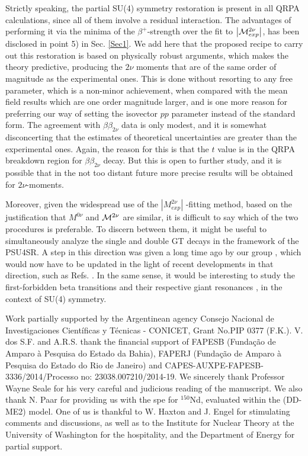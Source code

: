 \documentclass[nofootinbib,twocolumn,eqsecnum,floats,aps]{revtex4}
\def\b {{\beta}}
\begin{document}
{%
Strictly speaking, the partial SU(4) symmetry restoration is present in all QRPA
calculations, since all of them involve a residual interaction. The advantages
of performing it via the minima of the $\b^+$-strength over the fit
to $\left|{\cal M}^{2\nu}_{exp}\right|$, has been disclosed in  point 5)
in Sec. \ref{Sec1}.
We add here that the  proposed recipe to carry out this restoration is based
on physically robust arguments, which makes the theory  predictive, producing
the $2\nu$ moments that are of the same order of magnitude as the experimental ones.
This is done without resorting to any free parameter, which is a non-minor achievement,
when compared with the mean field results which are one order magnitude larger,  and
is one more reason for preferring our way of setting the isovector $pp$ parameter
instead of the standard form. The agreement with $\beta\beta_{2\nu}$ data is only modest,
and it is somewhat disconcerting that the estimates of theoretical uncertainties are greater
than the experimental ones. Again, the reason for this is that  the  $t$ value is
in the QRPA breakdown region for $\b\b_{2\nu}$ decay.
But this is open to further study, and it is possible that in the not too distant
future more precise results will be obtained for ${2\nu}$-moments.

Moreover, given the widespread use of
the  $\left| M^{2\nu}_{exp}\right|$ -fitting method,   based on
the justification that $ M^{0\nu}$ and ${\cal M}^{2\nu}$ are
similar, it is difficult to say
which of the two procedures is preferable.
To discern between them, it might be useful to simultaneously analyze the single and double GT 
decays in the framework of the PSU4SR.
A step in this direction was given a long time ago by our group \cite{Hir90b}, which would now 
have to be updated in the light of recent developments in that direction, such as Refs. \cite{Mad89,Hel97,Fre16,Sar16,Del17}. In the same sense, it would be interesting to study 
the first-forbidden beta transitions \cite{Fre17} and their respective giant 
resonances \cite{Krm80,Krm83}, in the context of SU(4) symmetry.

\begin{acknowledgements}
Work partially supported by the Argentinean agency Consejo Nacional
de Investigaciones Cient\'ificas y T\'ecnicas - CONICET, Grant No.PIP 0377 (F.K.).
V. dos S.F. and A.R.S. thank the financial support of FAPESB
(Funda\c{c}\~ao de Amparo \`a Pesquisa do Estado da Bahia),
FAPERJ (Funda\c{c}\~ao de Amparo \`a Pesquisa do Estado do Rio de Janeiro)
and CAPES-AUXPE-FAPESB-3336/2014/Processo no: 23038.007210/2014-19.
We sincerely thank Professor Wayne Seale for his very careful
and judicious reading of the manuscript.
We  also thank N. Paar for providing us  with the spe for $^{150}$Nd,
 evaluated within the (DD-ME2) model. 
One of us is thankful to W. Haxton and J. Engel for stimulating comments and
discussions, as well as to
the Institute for Nuclear Theory
at the University of Washington for the hospitality, and the Department of
Energy for partial support.



\end{acknowledgements}}
\end{document}
